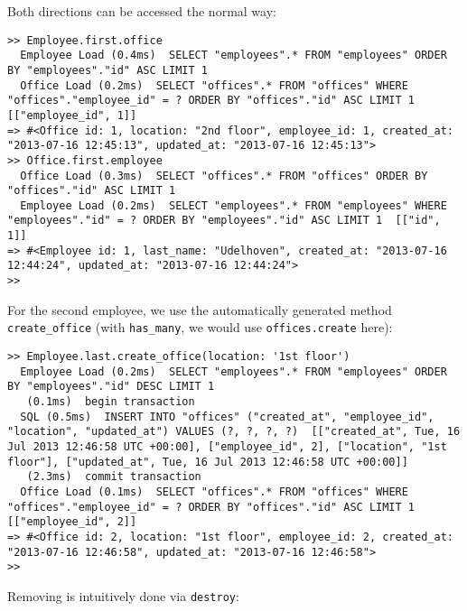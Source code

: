 \documentclass[a4paper]{book}
\begin{document}
Both directions can be accessed the normal way:

\begin{shaded}\begin{verbatim}
>> Employee.first.office
  Employee Load (0.4ms)  SELECT "employees".* FROM "employees" ORDER BY "employees"."id" ASC LIMIT 1
  Office Load (0.2ms)  SELECT "offices".* FROM "offices" WHERE "offices"."employee_id" = ? ORDER BY "offices"."id" ASC LIMIT 1  [["employee_id", 1]]
=> #<Office id: 1, location: "2nd floor", employee_id: 1, created_at: "2013-07-16 12:45:13", updated_at: "2013-07-16 12:45:13">
>> Office.first.employee
  Office Load (0.3ms)  SELECT "offices".* FROM "offices" ORDER BY "offices"."id" ASC LIMIT 1
  Employee Load (0.2ms)  SELECT "employees".* FROM "employees" WHERE "employees"."id" = ? ORDER BY "employees"."id" ASC LIMIT 1  [["id", 1]]
=> #<Employee id: 1, last_name: "Udelhoven", created_at: "2013-07-16 12:44:24", updated_at: "2013-07-16 12:44:24">
>>
\end{verbatim}\end{shaded}

For the second employee, we use the automatically generated method \texttt{create\_office} (with \texttt{has\_many}, we would use \texttt{offices.create} here):

\begin{shaded}\begin{verbatim}
>> Employee.last.create_office(location: '1st floor')
  Employee Load (0.2ms)  SELECT "employees".* FROM "employees" ORDER BY "employees"."id" DESC LIMIT 1
   (0.1ms)  begin transaction
  SQL (0.5ms)  INSERT INTO "offices" ("created_at", "employee_id", "location", "updated_at") VALUES (?, ?, ?, ?)  [["created_at", Tue, 16 Jul 2013 12:46:58 UTC +00:00], ["employee_id", 2], ["location", "1st floor"], ["updated_at", Tue, 16 Jul 2013 12:46:58 UTC +00:00]]
   (2.3ms)  commit transaction
  Office Load (0.1ms)  SELECT "offices".* FROM "offices" WHERE "offices"."employee_id" = ? ORDER BY "offices"."id" ASC LIMIT 1  [["employee_id", 2]]
=> #<Office id: 2, location: "1st floor", employee_id: 2, created_at: "2013-07-16 12:46:58", updated_at: "2013-07-16 12:46:58">
>>
\end{verbatim}\end{shaded}

Removing is intuitively done via \texttt{destroy}:
\end{document}
